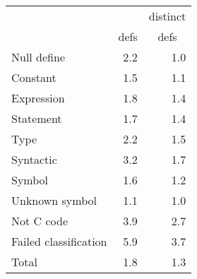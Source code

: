 \begin{tabular}{|l|r|r|} \hline
 & & \multicolumn{1}{c|}{distinct} \\
 & \multicolumn{1}{c|}{defs} & \multicolumn{1}{c|}{defs} \\ \hline
Null define & 2.2 & 1.0 \\
Constant & 1.5 & 1.1 \\
Expression & 1.8 & 1.4 \\
Statement & 1.7 & 1.4 \\
Type & 2.2 & 1.5 \\
Syntactic & 3.2 & 1.7 \\
Symbol & 1.6 & 1.2 \\
Unknown symbol & 1.1 & 1.0 \\
Not C code & 3.9 & 2.7 \\
Failed classification & 5.9 & 3.7 \\ \hline
Total & 1.8 & 1.3 \\ \hline
\end{tabular}

